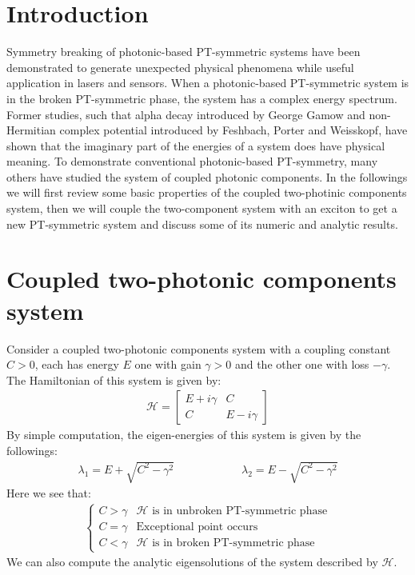 \documentclass[1pt]{book}
\theoremstyle{break}
\theoremstyle{break}
\newcommand{\bmat}[1]{\begin{bmatrix} #1 \end{bmatrix}}
\begin{document}
\section{Introduction}
Symmetry breaking of photonic-based PT-symmetric systems have been demonstrated to generate unexpected physical phenomena while useful application in lasers and sensors. When a photonic-based PT-symmetric system is in the broken PT-symmetric phase, the system has a complex energy spectrum. Former studies, such that alpha decay introduced by George Gamow and non-Hermitian complex potential introduced by Feshbach, Porter and Weisskopf, have shown that the imaginary part of the energies of a system does have physical meaning. To demonstrate conventional photonic-based PT-symmetry, many others have studied the system of coupled photonic components. In the followings we will first review some basic properties of the coupled two-photinic components system, then we will couple the two-component system with an exciton to get a new PT-symmetric system and discuss some of its numeric and analytic results.

\section{Coupled two-photonic components system}
Consider a coupled two-photonic components system with a coupling constant $C > 0$, each has energy $E$ one with gain $\gamma > 0$ and the other one with loss $-\gamma$. The Hamiltonian of this system is given by:
\begin{align*}
\mathcal{H } = \bmat{E+i\gamma & C \\  C & E - i\gamma}
\end{align*}
By simple computation, the eigen-energies of this system is given by the followings:
\begin{align*}
\lambda_1 = E + \sqrt{C^2 -\gamma^2} \qquad\qquad\qquad \lambda_2 = E - \sqrt{C^2 - \gamma^2}
\end{align*}
Here we see that:
\begin{align*}
\begin{cases}
C > \gamma & \mathcal{H} \text{ is in unbroken PT-symmetric phase} \\
C = \gamma & \text{Exceptional point occurs} \\
C < \gamma & \mathcal{H} \text{ is in broken PT-symmetric phase}
\end{cases}
\end{align*}
We can also compute the analytic eigensolutions of the system described by $\mathcal{H}$. \\
\end{document}
